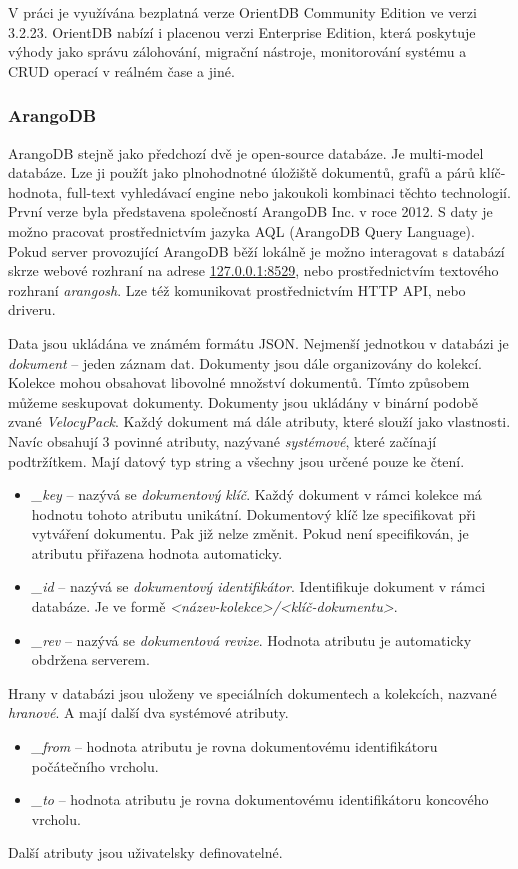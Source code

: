 \documentclass[
  program=infoi,
  biblatex=true,
  sourcecodes=true,
  figures=true,
  glossaries=false,
  index
]{kidiplom}
\begin{document}
V práci je využívána bezplatná verze OrientDB Community Edition ve verzi 3.2.23. OrientDB nabízí i placenou verzi Enterprise Edition, která poskytuje výhody jako správu zálohování, migrační nástroje, monitorování systému a CRUD operací v reálném čase a jiné.

\subsubsection{ArangoDB}
\cite{arangoDBDoc}
ArangoDB stejně jako předchozí dvě je open-source databáze. Je multi-model databáze. Lze ji použít jako plnohodnotné úložiště dokumentů, grafů a párů klíč-hodnota, full-text vyhledávací engine nebo jakoukoli kombinaci těchto technologií. První verze byla představena společností ArangoDB Inc. v roce 2012. S daty je možno pracovat prostřednictvím jazyka AQL (ArangoDB Query Language). Pokud server provozující ArangoDB běží lokálně je možno interagovat s databází skrze webové rozhraní na adrese \url{127.0.0.1:8529}, nebo prostřednictvím textového rozhraní \textit{arangosh}. Lze též komunikovat prostřednictvím HTTP API, nebo driveru.

Data jsou ukládána ve známém formátu JSON. Nejmenší jednotkou v databázi je \textit{dokument} -- jeden záznam dat. Dokumenty jsou dále organizovány do kolekcí. Kolekce mohou obsahovat libovolné množství dokumentů. Tímto způsobem můžeme seskupovat dokumenty. Dokumenty jsou ukládány v binární podobě zvané \textit{VelocyPack}. Každý dokument má dále atributy, které slouží jako vlastnosti. Navíc obsahují 3 povinné atributy, nazývané \textit{systémové}, které začínají podtržítkem. Mají datový typ string a všechny jsou určené pouze ke čtení.
\begin{itemize}
\item \textit{\_key} -- nazývá se \textit{dokumentový klíč}. Každý dokument v rámci kolekce má hodnotu tohoto atributu unikátní. Dokumentový klíč lze specifikovat při vytváření dokumentu. Pak již nelze změnit. Pokud není specifikován, je atributu přiřazena hodnota automaticky.
\item \textit{\_id} -- nazývá se \textit{dokumentový identifikátor}. Identifikuje dokument v rámci databáze. Je ve formě \textit{<název-kolekce>/<klíč-dokumentu>}.
\item \textit{\_rev} -- nazývá se \textit{dokumentová revize}. Hodnota atributu je automaticky obdržena serverem.
\end{itemize}
Hrany v databázi jsou uloženy ve speciálních dokumentech a kolekcích, nazvané \textit{hranové}. A mají další dva systémové atributy.
\begin{itemize}
\item \textit{\_from} -- hodnota atributu je rovna dokumentovému identifikátoru počátečního vrcholu.
\item \textit{\_to} -- hodnota atributu je rovna dokumentovému identifikátoru koncového vrcholu.
\end{itemize}
Další atributy jsou uživatelsky definovatelné. 
\end{document}
